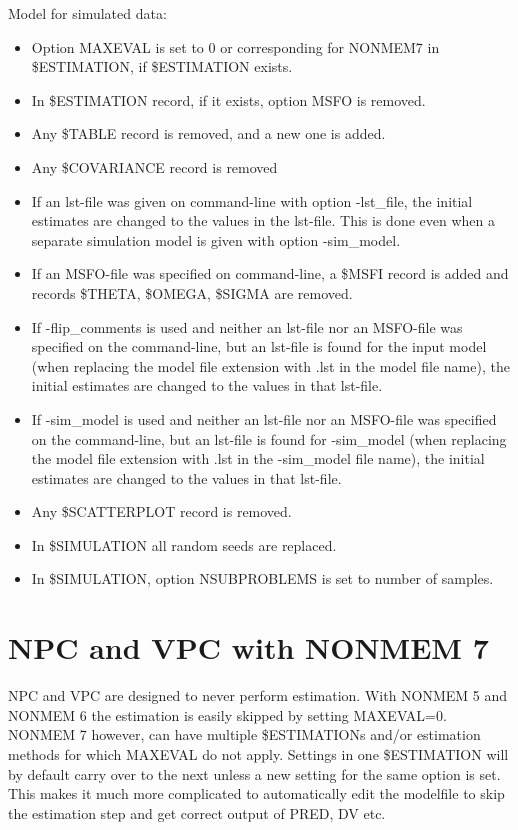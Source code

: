 Model for simulated data:
\begin{itemize}
	\item Option MAXEVAL is set to 0 or corresponding for  NONMEM7 in \$ESTIMATION, if \$ESTIMATION exists.
	\item In \$ESTIMATION record, if it exists, option MSFO is removed.
	\item Any \$TABLE record is removed, and a new one is added.
	\item Any \$COVARIANCE record is removed
	\item If an lst-file was given on command-line with option -lst\_file, 
the initial estimates are changed to the values in the lst-file. This is done even when a separate simulation model is given with option -sim\_model.
	\item If an MSFO-file was specified on command-line, a \$MSFI record is added and records \$THETA, \$OMEGA, \$SIGMA are removed.  
	\item If -flip\_comments is used and neither an lst-file nor an MSFO-file was specified on the command-line, 
but an lst-file is found for the input model (when replacing the model file extension 
with .lst in the model file name), 
the initial estimates are changed to the values in that lst-file.
	\item If -sim\_model is used and neither an lst-file nor an MSFO-file was specified on the command-line, 
but an lst-file is found for -sim\_model 
(when replacing the model file extension with .lst in the -sim\_model file name), 
the initial estimates are changed to the values in that lst-file.
	\item Any \$SCATTERPLOT record is removed.
	\item In \$SIMULATION all random seeds are replaced.      
	\item In \$SIMULATION, option NSUBPROBLEMS is set to number of samples.
\end{itemize}

\section{NPC and VPC with NONMEM 7}
NPC and VPC are designed to never perform estimation. With NONMEM 5 and NONMEM 6 the estimation is easily skipped by setting MAXEVAL=0. NONMEM 7 however,  can have multiple \$ESTIMATIONs and/or estimation methods for which MAXEVAL do not apply. Settings in one \$ESTIMATION will by default carry over to the next unless a new setting for the same option is set. This makes it much more complicated to automatically edit the modelfile to skip the estimation step and get correct output of PRED, DV etc. 

